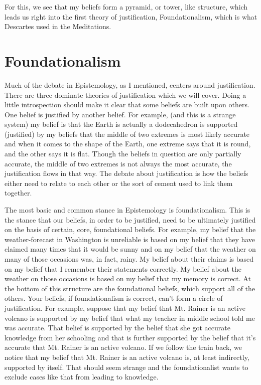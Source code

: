 
For this, we see that my beliefs form a pyramid, or tower, like structure, which leads us right into the first theory of justification, Foundationalism, which is what Descartes used in the Meditations.

\section{Foundationalism}
Much of the debate in Epistemology, as I mentioned, centers around justification. There are three dominate theories of justification which we will cover. Doing a little introspection should make it clear that some beliefs are built upon others. One belief is justified by another belief. For example, (and this is a strange system) my belief is that the Earth is actually a dodecahedron is supported (justified) by my beliefs that the middle of two extremes is most likely accurate and when it comes to the shape of the Earth, one extreme says that it is round, and the other says it is flat. Though the beliefs in question are only partially accurate, the middle of two extremes is not always the most accurate, the justification flows in that way. The debate about justification is how the beliefs either need to relate to each other or the sort of cement used to link them together.

The most basic and common stance in Epistemology is \Gls{foundationalism}. This is the stance that our beliefs, in order to be justified, need to be ultimately justified on the basis of certain, core, foundational beliefs. For example, my belief that the weather-forecast in Washington is unreliable is based on my belief that they have claimed many times that it would be sunny and on my belief that the weather on many of those occasions was, in fact, rainy. My belief about their claims is based on my belief that I remember their statements correctly. My belief about the weather on those occasions is based on my belief that my memory is correct. At the bottom of this structure are the foundational beliefs, which support all of the others. Your beliefs, if foundationalism is correct, can't form a circle of justification. For example, suppose that my belief that Mt. Rainer is an active volcano is supported by my belief that what my teacher in middle school told me was accurate. That belief is supported by the belief that she got accurate knowledge from her schooling and that is further supported by the belief that it's accurate that Mt. Rainer is an active volcano. If we follow the train back, we notice that my belief that Mt. Rainer is an active volcano is, at least indirectly, supported by itself. That should seem strange and the foundationalist wants to exclude cases like that from leading to knowledge.

